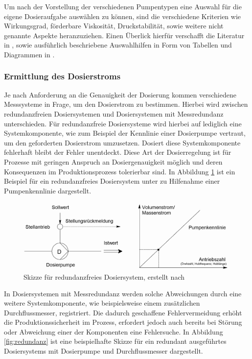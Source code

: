 Um nach der Vorstellung der verschiedenen Pumpentypen eine Auswahl für die eigene Dosieraufgabe auswählen zu können, sind die verschiedene Kriterien wie Wirkungsgrad, förderbare Viskosität, Druckstabilität, sowie weitere nicht genannte Aspekte heranzuziehen. Einen Überlick hierfür verschafft die Literatur in \mbox{\cite[S. 224 ff.]{Bierwerth.2019}}, sowie ausführlich beschriebene Auswahlhilfen in Form von Tabellen und Diagrammen in \cite[S. 125, 219, 659 ff.]{Vetter.2002}.


\subsubsection{Ermittlung des Dosierstroms}
Je nach Anforderung an die Genauigkeit der Dosierung kommen verschiedene Messsysteme in Frage, um den Dosierstrom zu bestimmen. Hierbei wird zwischen redundanzfreien Dosiersystemen und Dosiersystemen mit Messredundanz unterschieden.\linebreak
Für redundanzfreie Dosiersysteme wird hierbei auf lediglich eine Systemkomponente, wie zum Beispiel der Kennlinie einer Dosierpumpe vertraut, um den geforderten Dosierstrom umzusetzen. Dosiert diese Systemkomponente fehlerhaft bleibt der Fehler unentdeckt. Diese Art der Dosierregelung ist für Prozesse mit geringen Anspruch an Dosiergenauigkeit möglich und deren Konsequenzen im Produktionsprozess tolerierbar sind. In Abbildung \ref{fig:redundanzfrei} ist ein Beispiel für ein redundanzfreies Dosiersystem unter zu Hilfenahme einer Pumpenkennlinie dargestellt.\cite{Vetter.2002}

\begin{figure}[h!]
	\centering
	\includegraphics[width=1.0\textwidth]{img/redundanzfrei}
	\caption{Skizze für redundanzfreies Dosiersystem, erstellt nach \cite{Vetter.2002}}
	\label{fig:redundanzfrei}
\end{figure}
\FloatBarrier

In Dosiersystemen mit Messredundanz werden solche Abweichungen durch eine weitere Systemkomponente, wie beispielsweise einem zusätzlichen Durchflussmesser, registriert. Die dadurch geschaffene Fehlervermeidung erhöht die Produktionssicherheit im Prozess, erfordert jedoch auch bereits bei Störung oder Abweichung einer der Komponenten eine Fehlersuche. In Abbildung \ref{fig:redundanz} ist eine beispielhafte Skizze für ein redundant ausgeführtes Dosiersystems mit Dosierpumpe und Durchflussmesser dargestellt.\,\cite{Vetter.2002}

